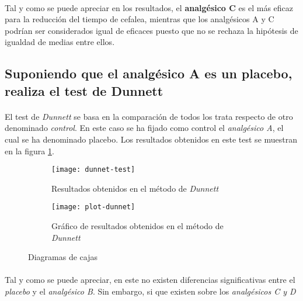 \documentclass[11pt]{article}
\begin{document}
      \paragraph{}
      Tal y como se puede apreciar en los resultados, el \textbf{analgésico C} es el más eficaz para la reducción del tiempo de cefalea, mientras que los analgésicos A y C podrían ser considerados igual de eficaces puesto que no se rechaza la hipótesis de igualdad de medias entre ellos.

    \subsection{Suponiendo que el analgésico A es un placebo, realiza el test de Dunnett}

      \paragraph{}
      El test de \emph{Dunnett} se basa en la comparación de todos los trata respecto de otro denominado \emph{control}. En este caso se ha fijado como control el \emph{analgésico A}, el cual se ha denominado placebo. Los resultados obtenidos en este test se muestran en la figura \ref{fig:1f1b-anova-dunnet-results}.

      \begin{figure}[!h]
        \centering
        \begin{subfigure}{.5\textwidth}
          \centering
          \texttt{[image: dunnet-test]}
          \caption{Resultados obtenidos en el método de \emph{Dunnett}}
          \label{fig:1f1b-anova-dunnet-results}
        \end{subfigure}%
        \begin{subfigure}{.5\textwidth}
          \centering
          \texttt{[image: plot-dunnet]}
          \caption{Gráfico de resultados obtenidos en el método de \emph{Dunnett}}
          \label{fig:1f1b-anova-dunnet-plot}
        \end{subfigure}
        \caption{Diagramas de cajas}
        \label{fig:dunnet}
      \end{figure}

      \paragraph{}
      Tal y como se puede apreciar, en este no existen diferencias significativas entre el \emph{placebo} y el \emph{analgésico B}. Sin embargo, si que existen sobre los \emph{analgésicos C y D}
\end{document}
